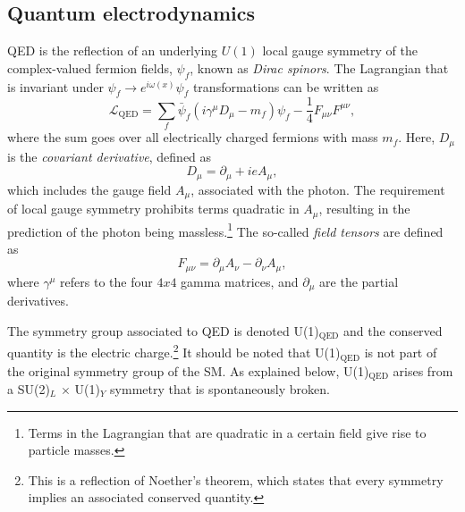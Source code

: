 \subsection{Quantum electrodynamics}
\label{subsec:qed}
QED is the reflection of an underlying $U(1)$ local gauge symmetry of the complex-valued fermion fields, $\psi_f$, known as \emph{Dirac spinors}.
The Lagrangian that is invariant under $\psi_f \rightarrow e^{i \omega(x)} \psi_f$ transformations can be written as
\begin{equation}
  \mathcal{L}_{\text{QED}} = \sum_f \bar{\psi}_f(i\gamma^\mu D_\mu - m_f)\psi_f - \frac{1}{4}F_{\mu\nu}F^{\mu\nu},
  \label{eq:Lagrangianqed}
\end{equation}
where the sum goes over all electrically charged fermions with mass $m_f$.
Here, $D_\mu$ is the \emph{covariant derivative}, defined as
\begin{equation}
  D_\mu = \partial_\mu + ieA_\mu,
\end{equation}
which includes the gauge field $A_\mu$, associated with the photon. The requirement of local gauge symmetry prohibits terms quadratic in $A_\mu$, resulting in the prediction of the photon being massless.\footnote{Terms in the Lagrangian that are quadratic in a certain field give rise to particle masses.}
The so-called \emph{field tensors} are defined as
\begin{equation}
  F_{\mu\nu} = \partial_\mu A_\nu - \partial_\nu A_\mu,
\end{equation}
where $\gamma^\mu$ refers to the four $4x4$ gamma matrices, and $\partial_\mu$ are the partial derivatives.

The symmetry group associated to QED is denoted U(1)$_{\text{QED}}$ and the conserved quantity is the electric charge.\footnote{This is a reflection of Noether's theorem, which states that every symmetry implies an associated conserved quantity.}
It should be noted that U(1)$_{\text{QED}}$ is not part of the original symmetry group of the SM. As explained below, U(1)$_{\text{QED}}$ arises from a SU(2)$_L$ $\times$ U(1)$_Y$ symmetry that is spontaneously broken.


